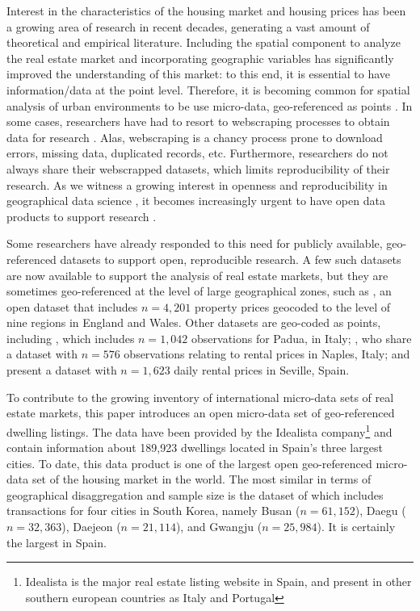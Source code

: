\documentclass[Royal,times,sageh]{sagej}
\begin{document}
Interest in the characteristics of the housing market and housing prices
has been a growing area of research in recent decades, generating a vast
amount of theoretical and empirical literature. Including the spatial
component to analyze the real estate market and incorporating geographic
variables has significantly improved the understanding of this market:
to this end, it is essential to have information/data at the point
level. Therefore, it is becoming common for spatial analysis of urban
environments to be use micro-data, geo-referenced as points
\citep{lopez2015}. In some cases, researchers have had to resort to
webscraping processes to obtain data for research
\citep[e.g.,][]{gupta2022take, arbia2020spatial, Li2019, lopez2015}.
Alas, webscraping is a chancy process prone to download errors, missing
data, duplicated records, etc. Furthermore, researchers do not always
share their webscrapped datasets, which limits reproducibility of their
research. As we witness a growing interest in openness and
reproducibility in geographical data science
\citep{arribasl2021editorial, paez2021open, brunsdon2021opening}, it
becomes increasingly urgent to have open data products to support
research \citep{arribas2021}.

Some researchers have already responded to this need for publicly
available, geo-referenced datasets to support open, reproducible
research. A few such datasets are now available to support the analysis
of real estate markets, but they are sometimes geo-referenced at the
level of large geographical zones, such as \citet{fuerst2020real}, an
open dataset that includes \(n=4,201\) property prices geocoded to the
level of nine regions in England and Wales. Other datasets are geo-coded
as points, including \citet{bonifaci2015real}, which includes
\(n=1,042\) observations for Padua, in Italy;
\citet{delgiudice2018housing}, who share a dataset with \(n=576\)
observations relating to rental prices in Naples, Italy; and
\citet{solano2019dataset} present a dataset with \(n=1,623\) daily
rental prices in Seville, Spain.

To contribute to the growing inventory of international micro-data sets
of real estate markets, this paper introduces an open micro-data set of
geo-referenced dwelling listings. The data have been provided by the
Idealista
company\footnote{Idealista is the major real estate listing website in Spain, and present in other southern european countries as Italy and Portugal}
and contain information about 189,923 dwellings located in Spain's three
largest cities. To date, this data product is one of the largest open
geo-referenced micro-data set of the housing market in the world. The
most similar in terms of geographical disaggregation and sample size is
the dataset of \citet{song2021hedonic} which includes transactions for
four cities in South Korea, namely Busan (\(n=61,152\)), Daegu
(\(n=32,363\)), Daejeon (\(n=21,114\)), and Gwangju (\(n=25,984\)). It
is certainly the largest in Spain.
\end{document}
